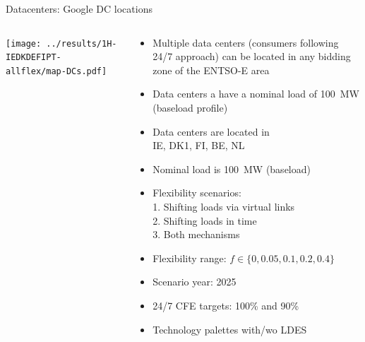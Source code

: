 \begin{frame}{Datacenters: Google DC locations}

  \begin{columns}[T]
  \begin{column}{10cm}

  \centering
  \texttt{[image: ../results/1H-IEDKDEFIPT-allflex/map-DCs.pdf]}
  
  \end{column}

  \begin{column}{6cm}
  {\small
  \begin{itemize}

  \item \alert{Multiple data centers} (consumers following 24/7 approach) can be located 
  in any bidding zone of the ENTSO-E area

  \item Data centers a have a nominal load of \alert{100~MW} (baseload profile)

  \item Data centers are located in \\ \alert{IE, DK1, FI, BE, NL}
  \item Nominal load is 100~MW (baseload)
  \item Flexibility scenarios: \\
        1. Shifting loads via virtual links \\ 
        2. Shifting loads in time \\ 
        3. Both mechanisms
  \item Flexibility range: $f \in \{0,0.05,0.1,0.2,0.4\}$ 
  \item Scenario year: 2025
  \item 24/7 CFE targets: 100\% and 90\%
  \item Technology palettes with/wo LDES
  
\end{itemize}
  }

  \end{column}
  \end{columns}

\end{frame}



